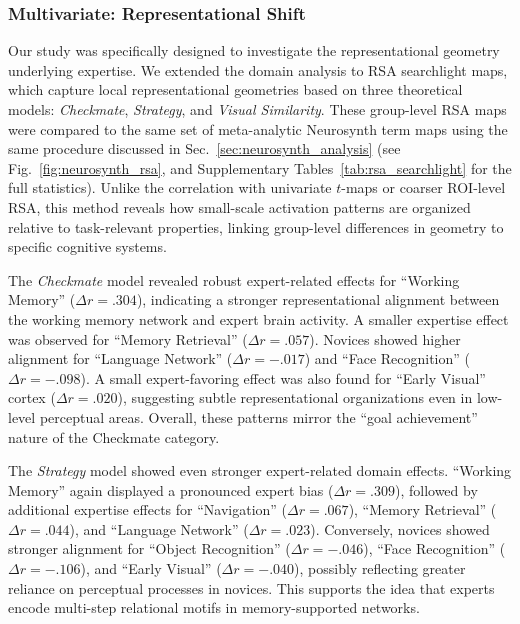 \documentclass[preprint,12pt]{elsarticle}
\begin{document}
\subsubsection{Multivariate: Representational Shift}
Our study was specifically designed to investigate the representational geometry underlying expertise. We extended the domain analysis to RSA searchlight maps, which capture local representational geometries based on three theoretical models: \emph{Checkmate}, \emph{Strategy}, and \emph{Visual Similarity}. These group-level RSA maps were compared to the same set of meta-analytic Neurosynth term maps using the same procedure discussed in Sec.~\ref{sec:neurosynth_analysis} (see Fig.~\ref{fig:neurosynth_rsa}, and Supplementary Tables~\ref{tab:rsa_searchlight} for the full statistics). Unlike the correlation with univariate $t$-maps or coarser ROI-level RSA, this method reveals how small-scale activation patterns are organized relative to task-relevant properties, linking group-level differences in geometry to specific cognitive systems.

The \textit{Checkmate} model revealed robust expert-related effects for ``Working Memory'' ($\Delta r = .304$), indicating a stronger representational alignment between the working memory network and expert brain activity. A smaller expertise effect was observed for ``Memory Retrieval'' ($\Delta r = .057$). Novices showed higher alignment for ``Language Network'' ($\Delta r = -.017$) and ``Face Recognition'' ($\Delta r = -.098$). A small expert-favoring effect was also found for ``Early Visual'' cortex ($\Delta r = .020$), suggesting subtle representational organizations even in low-level perceptual areas. Overall, these patterns mirror the “goal achievement” nature of the Checkmate category.

The \textit{Strategy} model showed even stronger expert-related domain effects. ``Working Memory'' again displayed a pronounced expert bias ($\Delta r = .309$), followed by additional expertise effects for ``Navigation'' ($\Delta r = .067$), ``Memory Retrieval'' ($\Delta r = .044$), and ``Language Network'' ($\Delta r = .023$). Conversely, novices showed stronger alignment for ``Object Recognition'' ($\Delta r = -.046$), ``Face Recognition'' ($\Delta r = -.106$), and ``Early Visual'' ($\Delta r = -.040$), possibly reflecting greater reliance on perceptual processes in novices. This supports the idea that experts encode multi-step relational motifs in memory-supported networks.
\end{document}
